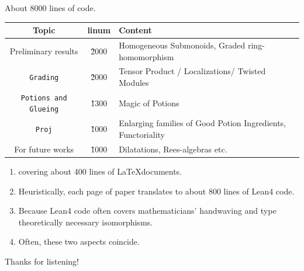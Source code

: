 \documentclass[9pt]{beamer}
\begin{document}
\begin{frame}[fragile]
  About 8000 lines of code.
    \begin{tabular}{c|c|p{}}
      Topic & linum & Content \\ \hline
      Preliminary results & \~2000 & Homogeneous Submonoids, Graded ring-homomorphism \\\hline
      \texttt{Grading} & \~2000 & Tensor Product / Localizations/ Twisted Modules \\\hline
      \texttt{Potions and Glueing} &  \~1300 &  Magic of Potions \\\hline
      \texttt{Proj} & \~1000 & Enlarging families of Good Potion Ingredients, Functoriality \\\hline
      For future works & \~1000 & Dilatations, Rees-algebras etc.
    \end{tabular}
  \begin{enumerate}
    \item<2-> covering about 400 lines of \LaTeX documents.
    \item<3-> Heuristically, each page of paper translates to about 800 lines of Lean4 code.
    \item<4-> Because Lean4 code often covers mathematicians' handwaving and type theoretically necessary isomorphisms.
    \item<5-> Often, these two aspects coincide.
  \end{enumerate}
\end{frame}

\begin{frame}
\begin{center}
Thanks for listening!
\end{center}
\end{frame}
\end{document}
